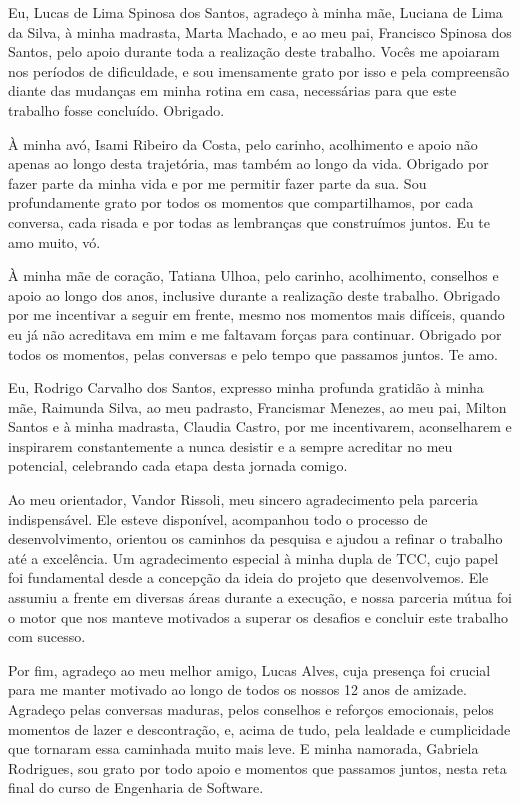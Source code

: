 \begin{agradecimentos}


Eu, Lucas de Lima Spinosa dos Santos, agradeço à minha mãe, Luciana de Lima da Silva, à minha madrasta, Marta Machado, e ao meu pai, Francisco Spinosa dos Santos, pelo apoio durante toda a realização deste trabalho. Vocês me apoiaram nos períodos de dificuldade, e sou imensamente grato por isso e pela compreensão diante das mudanças em minha rotina em casa, necessárias para que este trabalho fosse concluído. Obrigado.

À minha avó, Isami Ribeiro da Costa, pelo carinho, acolhimento e apoio não apenas ao longo desta trajetória, mas também ao longo da vida. Obrigado por fazer parte da minha vida e por me permitir fazer parte da sua. Sou profundamente grato por todos os momentos que compartilhamos, por cada conversa, cada risada e por todas as lembranças que construímos juntos. Eu te amo muito, vó.

À minha mãe de coração, Tatiana Ulhoa, pelo carinho, acolhimento, conselhos e apoio ao longo dos anos, inclusive durante a realização deste trabalho. Obrigado por me incentivar a seguir em frente, mesmo nos momentos mais difíceis, quando eu já não acreditava em mim e me faltavam forças para continuar. Obrigado por todos os momentos, pelas conversas e pelo tempo que passamos juntos. Te amo.

Eu, Rodrigo Carvalho dos Santos, expresso minha profunda gratidão à minha mãe, Raimunda Silva, ao meu padrasto, Francismar Menezes, ao meu pai, Milton Santos e à minha madrasta, Claudia Castro, por me incentivarem, aconselharem e inspirarem constantemente a nunca desistir e a sempre acreditar no meu potencial, celebrando cada etapa desta jornada comigo.

Ao meu orientador, Vandor Rissoli, meu sincero agradecimento pela parceria indispensável. Ele esteve disponível, acompanhou todo o processo de desenvolvimento, orientou os caminhos da pesquisa e ajudou a refinar o trabalho até a excelência. Um agradecimento especial à minha dupla de TCC, cujo papel foi fundamental desde a concepção da ideia do projeto que desenvolvemos. Ele assumiu a frente em diversas áreas durante a execução, e nossa parceria mútua foi o motor que nos manteve motivados a superar os desafios e concluir este trabalho com sucesso.

Por fim, agradeço ao meu melhor amigo, Lucas Alves, cuja presença foi crucial para me manter motivado ao longo de todos os nossos 12 anos de amizade. Agradeço pelas conversas maduras, pelos conselhos e reforços emocionais, pelos momentos de lazer e descontração, e, acima de tudo, pela lealdade e cumplicidade que tornaram essa caminhada muito mais leve. E minha namorada, Gabriela Rodrigues, sou grato por todo apoio e momentos que passamos juntos, nesta reta final do curso de Engenharia de Software.


\end{agradecimentos}
